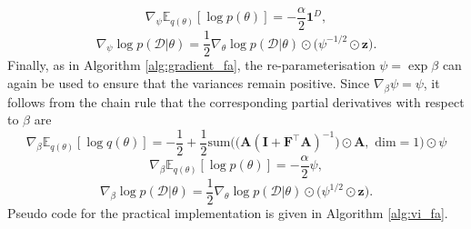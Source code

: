 \documentclass[msc,deptreport.inf]{infthesis} %
\newcommand{\matr}[1]{\mathbf{#1}}
\newcommand{\E}{\mathbb E}
\begin{document}
\begin{equation}
	\nabla_\psi \E_{q(\theta)} [\log p(\theta)] = -\frac{\alpha}{2} \matr{1}^D,
\end{equation}
\begin{equation}
	\nabla_{\psi} \log p(\mathcal{D} | \theta) = \frac{1}{2} \nabla_\theta \log p(\mathcal{D} | \theta) \odot \big(\psi^{-1/2} \odot \matr{z} \big).
\end{equation}
Finally, as in Algorithm \ref{alg:gradient_fa}, the re-parameterisation $\psi = \exp \beta$ can again be used to ensure that the variances remain positive. Since $\nabla_\beta \psi = \psi$, it follows from the chain rule that the corresponding partial derivatives with respect to $\beta$ are 
\begin{equation}
	\nabla_\beta \E_{q(\theta)} [\log q(\theta)] = -\frac{1}{2} + \frac{1}{2} \text{sum}\Big(\big(\matr{A}  (\matr{I} + \matr{F}^\intercal \matr{A})^{-1}\big) \odot \matr{A}, \text{ dim} = 1\Big) \odot \psi 
\end{equation}
\begin{equation}
	\nabla_\beta \E_{q(\theta)} [\log p(\theta)] = -\frac{\alpha}{2} \psi,
\end{equation}
\begin{equation}
	\nabla_{\beta} \log p(\mathcal{D} | \theta) = \frac{1}{2} \nabla_\theta \log p(\mathcal{D} | \theta) \odot \big(\psi^{1/2} \odot \matr{z}\big).
\end{equation}
Pseudo code for the practical implementation is given in Algorithm \ref{alg:vi_fa}.
\end{document}
